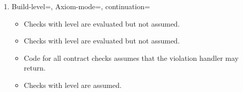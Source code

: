 \begin{enumerate}
\item Build-level=, Axiom-mode=, continuation=
\begin{itemize}
  \item Checks with  level are evaluated but not assumed.
  \item Checks with  level are evaluated but not assumed.
  \item Code for all contract checks assumes that the violation handler may return.
  \item Checks with  level are assumed.
\end{itemize}

\end{enumerate}
